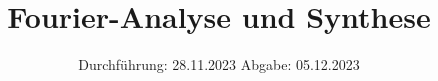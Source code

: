 

\subject{VERSUCH NUMMER}
\title{Fourier-Analyse und Synthese}
\date{%
  Durchführung: 28.11.2023
  \hspace{3em}
  Abgabe: 05.12.2023
}



\maketitle
\thispagestyle{empty}
\tableofcontents
\newpage






\printbibliography{}


